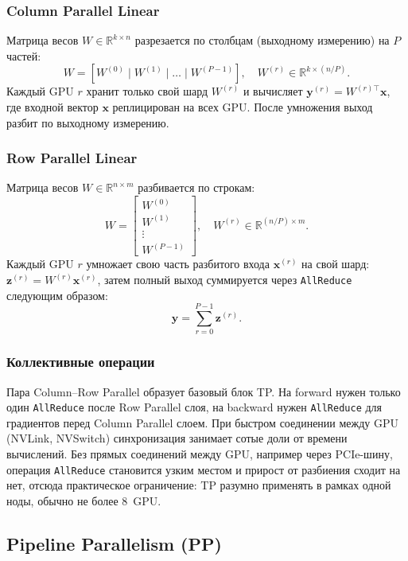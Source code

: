 \subsubsection{Column Parallel Linear}

Матрица весов $W \in \mathbb{R}^{k \times n}$ разрезается по столбцам
(выходному измерению) на $P$ частей:
$$W = [W^{(0)} \mid W^{(1)} \mid \ldots \mid W^{(P-1)}], \quad
  W^{(r)} \in \mathbb{R}^{k \times (n/P)}.$$
Каждый GPU $r$ хранит только свой шард $W^{(r)}$ и вычисляет
$\mathbf{y}^{(r)} = W^{(r)\top} \mathbf{x}$, где входной вектор
$\mathbf{x}$ реплицирован на всех GPU.
После умножения выход разбит по выходному измерению.

\subsubsection{Row Parallel Linear}

Матрица весов $W \in \mathbb{R}^{n \times m}$ разбивается по строкам:
$$W = \begin{bmatrix} W^{(0)} \\ W^{(1)} \\ \vdots \\ W^{(P-1)} \end{bmatrix},
  \quad W^{(r)} \in \mathbb{R}^{(n/P) \times m}.$$
Каждый GPU $r$ умножает свою часть разбитого входа $\mathbf{x}^{(r)}$
на свой шард: $\mathbf{z}^{(r)} = W^{(r)} \mathbf{x}^{(r)}$,
затем полный выход суммируется через \texttt{AllReduce} следующим образом:
$$\mathbf{y} = \sum_{r=0}^{P-1} \mathbf{z}^{(r)}.$$

\subsubsection{Коллективные операции}

Пара Column--Row Parallel образует базовый блок TP.
На forward нужен только один \texttt{AllReduce} после Row Parallel слоя,
на backward нужен \texttt{AllReduce} для градиентов перед Column
Parallel слоем.
При быстром соединении между GPU (NVLink, NVSwitch) синхронизация
занимает сотые доли от времени вычислений\cite{MegatronLM2020}.
Без прямых соединений между GPU, например через PCIe-шину,
операция \texttt{AllReduce} становится узким местом и прирост от разбиения
сходит на нет, отсюда практическое ограничение: TP разумно
применять в рамках одной ноды, обычно не более 8~GPU.

\subsection{Pipeline Parallelism (PP)}

